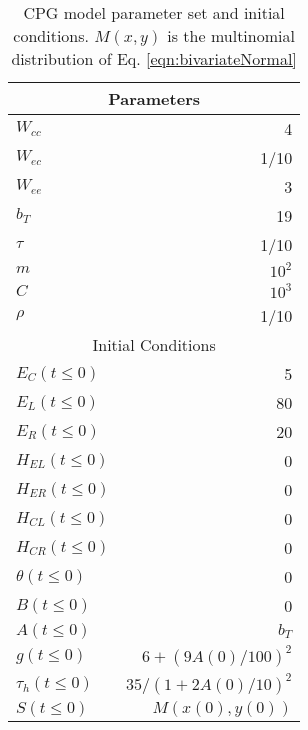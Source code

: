 
\begin{table}[ht!]
 \centering
\begin{tabular}{| l | r |}
 \hline 
\multicolumn{2}{|c|}{Parameters} \\
 \hline 
$W_{cc}$ & 4 \\ \hline
$W_{ec}$ & 1/10\\ \hline
$W_{ee}$ & 3\\ \hline
$b_T$ & 19 \\ \hline
$\tau$ & 1/10 \\ \hline
$m$ & $10^2$ \\ \hline
$C$ & $10^3$ \\ \hline
$\rho$ & 1/10 \\ %
 \hline 
\multicolumn{2}{|c|}{Initial Conditions} \\
 \hline 
$E_C(t \leq 0)$ & 5 \\
$E_L(t \leq 0)$ & 80 \\
$E_R(t \leq 0)$ & 20 \\
$H_{EL}(t \leq 0)$ & 0 \\
$H_{ER}(t \leq 0)$ & 0 \\
$H_{CL}(t \leq 0)$ & 0 \\
$H_{CR}(t \leq 0)$ & 0 \\
$\theta(t \leq 0) $ & 0 \\
$B(t \leq 0) $ & 0 \\
$A(t \leq 0) $ & $b_T$ \\
$g(t \leq 0) $ & $6 + (9 A(0)/100)^2$ \\
$\tau_h(t \leq 0) $ & $35 / (1 + 2A(0)/10)^2$ \\ 
$S(t \leq 0) $ & $M(x(0),y(0))$ \\ \hline
\end{tabular}
 \caption{CPG model parameter set and initial conditions. $M(x,y)$ is the multinomial distribution of Eq. \eqref{eqn:bivariateNormal}
\label{tbl:OscparameterSet} }
\end{table}

